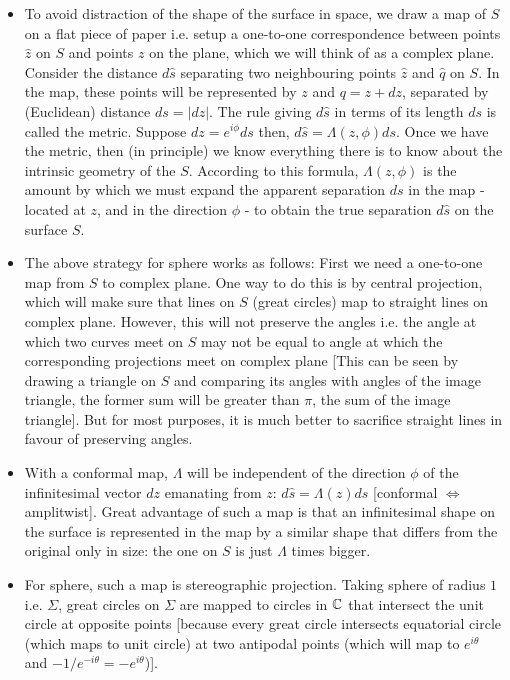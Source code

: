 \documentclass[12pt]{article}
\def\mb{\ensuremath\mathbb}
\def\C{\ensuremath\mb{C}}
\begin{document}
\begin{itemize}
    \item To avoid distraction of the shape of the surface in space, we draw a map of $S$ on a flat piece of paper i.e. setup a one-to-one correspondence between points $\hat{z}$ on $S$ and points $z$ on the plane, which we will think of as a complex plane. Consider the distance $d\hat{s}$ separating two neighbouring points $\hat{z}$ and $\hat{q}$ on $S$. In the map, these points will be represented by $z$ and $q=z+dz$, separated by (Euclidean) distance $ds=|dz|$. The rule giving $d\hat{s}$ in terms of its length $ds$ is called the metric. Suppose $dz=e^{i\phi}ds$ then, $d\hat{s} = \Lambda(z,\phi)ds$. Once we have the metric, then (in principle) we know everything there is to know about the intrinsic geometry of the $S$. According to this formula, $\Lambda(z,\phi)$ is the amount by which we must expand the apparent separation $ds$ in the map - located at $z$, and in the direction $\phi$ - to obtain the true separation $d\hat{s}$ on the surface $S$.

    \item The above strategy for sphere works as follows: First we need a one-to-one map from $S$ to complex plane. One way to do this is by central projection, which will make sure that lines on $S$ (great circles) map to straight lines on complex plane. However, this will not preserve the angles i.e. the angle at which two curves meet on $S$ may not be equal to angle at which the corresponding projections meet on complex plane [This can be seen by drawing a triangle on $S$ and comparing its angles with angles of the image triangle, the former sum will be greater than $\pi$, the sum of the image triangle]. But for most purposes, it is much better to sacrifice straight lines in favour of preserving angles.
    
    \item With a conformal map, $\Lambda$ will be independent of the direction $\phi$ of the infinitesimal vector $dz$ emanating from $z$: $d\hat{s} = \Lambda(z)ds$ [conformal $\iff$ amplitwist]. Great advantage of such a map is that an infinitesimal shape on the surface is represented in the map by a similar shape that differs from the original only in size: the one on $S$ is just $\Lambda$ times bigger.
    
    \item For sphere, such a map is stereographic projection. Taking sphere of radius $1$ i.e. $\Sigma$, great circles on $\Sigma$ are mapped to circles in $\C$ that intersect the unit circle at opposite points [because every great circle intersects equatorial circle (which maps to unit circle) at two antipodal points (which will map to $e^{i\theta}$ and $-1/e^{-i\theta} = -e^{i\theta}$)].
    

\end{itemize}
\end{document}
